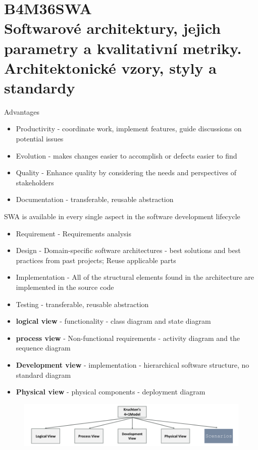 \chapter[Softwarové Architektury]{B4M36SWA \\[1ex]\Large{Softwarové architektury, jejich parametry a kvalitativní metriky. Architektonické vzory, styly a standardy}}

Advantages
\begin{itemize}
    \item Productivity - coordinate work, implement features, guide discussions on potential issues
    \item Evolution - makes changes easier to accomplish or defects easier to find
    \item Quality - Enhance quality by considering the needs and perspectives of stakeholders
    \item Documentation - transferable, reusable abstraction
\end{itemize}

SWA is available in every single aspect in the software development lifecycle

\begin{itemize}
    \item Requirement - Requirements analysis
    \item Design - Domain-specific software architectures - best solutions and best practices from past projects; Reuse applicable parts
    \item Implementation - All of the structural elements found in the architecture are implemented in the source code
    \item Testing - transferable, reusable abstraction
\end{itemize}



\begin{itemize}
    \item \textbf{logical view} - functionality - class diagram and state diagram
    \item \textbf{process view} - Non-functional requirements - activity diagram and the sequence diagram
    \item \textbf{Development view} - implementation - hierarchical software structure, no standard diagram
    \item \textbf{Physical view} - physical components - deployment diagram
\end{itemize}

\begin{figure}[ht!]
\centering
\includegraphics[width=\textwidth]{oborove/SWA/img/krutchen.png}
\end{figure}



